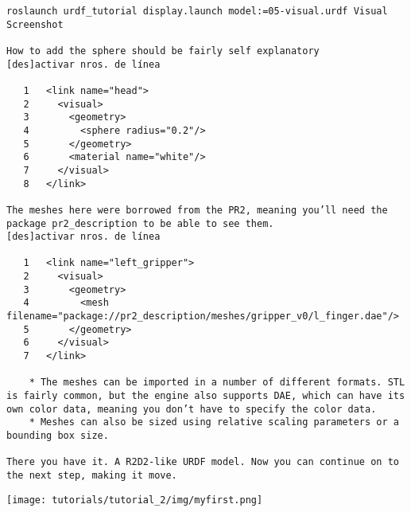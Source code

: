 \begin{verbatim}
roslaunch urdf_tutorial display.launch model:=05-visual.urdf Visual Screenshot

How to add the sphere should be fairly self explanatory
[des]activar nros. de línea

   1   <link name="head">
   2     <visual>
   3       <geometry>
   4         <sphere radius="0.2"/>
   5       </geometry>
   6       <material name="white"/>
   7     </visual>
   8   </link>

The meshes here were borrowed from the PR2, meaning you’ll need the package pr2_description to be able to see them.
[des]activar nros. de línea

   1   <link name="left_gripper">
   2     <visual>
   3       <geometry>
   4         <mesh filename="package://pr2_description/meshes/gripper_v0/l_finger.dae"/>
   5       </geometry>
   6     </visual>
   7   </link>

    * The meshes can be imported in a number of different formats. STL is fairly common, but the engine also supports DAE, which can have its own color data, meaning you don’t have to specify the color data.
    * Meshes can also be sized using relative scaling parameters or a bounding box size. 

There you have it. A R2D2-like URDF model. Now you can continue on to the next step, making it move. 
\end{verbatim}


\texttt{[image: tutorials/tutorial\_2/img/myfirst.png]}	

